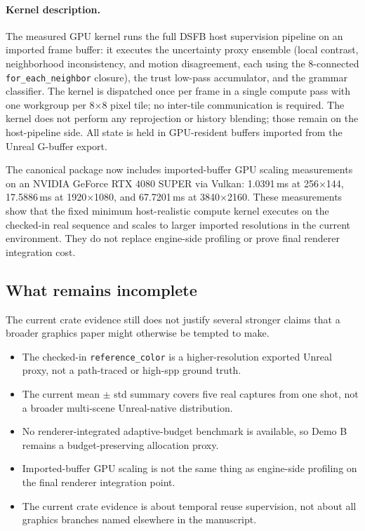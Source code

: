 \documentclass[11pt]{article}
\theoremstyle{definition}
\theoremstyle{plain}
\begin{document}
\paragraph{Kernel description.}
The measured GPU kernel runs the full DSFB host supervision pipeline on an imported frame buffer: it executes the uncertainty proxy ensemble (local contrast, neighborhood inconsistency, and motion disagreement, each using the 8-connected \texttt{for\_each\_neighbor} closure), the trust low-pass accumulator, and the grammar classifier. The kernel is dispatched once per frame in a single compute pass with one workgroup per 8$\times$8 pixel tile; no inter-tile communication is required. The kernel does not perform any reprojection or history blending; those remain on the host-pipeline side. All state is held in GPU-resident buffers imported from the Unreal G-buffer export.

The canonical package now includes imported-buffer GPU scaling measurements on an NVIDIA GeForce RTX 4080 SUPER via Vulkan: 1.0391\,ms at 256$\times$144, 17.5886\,ms at 1920$\times$1080, and 67.7201\,ms at 3840$\times$2160. These measurements show that the fixed minimum host-realistic compute kernel executes on the checked-in real sequence and scales to larger imported resolutions in the current environment. They do not replace engine-side profiling or prove final renderer integration cost.

\subsection{What remains incomplete}

The current crate evidence still does not justify several stronger claims that a broader graphics paper might otherwise be tempted to make.
\begin{itemize}[leftmargin=1.5em]
    \item The checked-in \texttt{reference\_color} is a higher-resolution exported Unreal proxy, not a path-traced or high-spp ground truth.
    \item The current mean $\pm$ std summary covers five real captures from one shot, not a broader multi-scene Unreal-native distribution.
    \item No renderer-integrated adaptive-budget benchmark is available, so Demo B remains a budget-preserving allocation proxy.
    \item Imported-buffer GPU scaling is not the same thing as engine-side profiling on the final renderer integration point.
    \item The current crate evidence is about temporal reuse supervision, not about all graphics branches named elsewhere in the manuscript.
\end{itemize}
\end{document}
